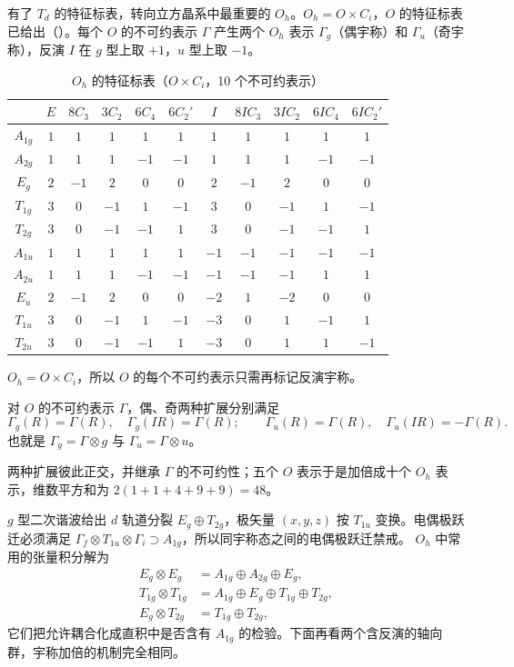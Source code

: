 有了 $T_d$ 的特征标表，转向立方晶系中最重要的 $O_h$。$O_h=O\times C_i$，$O$ 的特征标表已给出（）。每个 $O$ 的不可约表示 $\Gamma$ 产生两个 $O_h$ 表示 $\Gamma_g$（偶宇称）和 $\Gamma_u$（奇宇称），反演 $I$ 在 $g$ 型上取 $+1$，$u$ 型上取 $-1$。

\begin{table}[htbp]

\centering
\caption{$O_h$ 的特征标表（$O\times C_i$，10 个不可约表示）}
\label{tab:oh-character}
\small
\begin{tabular}{c|cccccccccc}
\toprule
 & $E$ & $8C_3$ & $3C_2$ & $6C_4$ & $6C_2'$ & $I$ & $8IC_3$ & $3IC_2$ & $6IC_4$ & $6IC_2'$ \\
\midrule
$A_{1g}$ & $1$&$1$&$1$&$1$&$1$&$1$&$1$&$1$&$1$&$1$ \\
$A_{2g}$ & $1$&$1$&$1$&$-1$&$-1$&$1$&$1$&$1$&$-1$&$-1$ \\
$E_g$   & $2$&$-1$&$2$&$0$&$0$&$2$&$-1$&$2$&$0$&$0$ \\
$T_{1g}$ & $3$&$0$&$-1$&$1$&$-1$&$3$&$0$&$-1$&$1$&$-1$ \\
$T_{2g}$ & $3$&$0$&$-1$&$-1$&$1$&$3$&$0$&$-1$&$-1$&$1$ \\
$A_{1u}$ & $1$&$1$&$1$&$1$&$1$&$-1$&$-1$&$-1$&$-1$&$-1$ \\
$A_{2u}$ & $1$&$1$&$1$&$-1$&$-1$&$-1$&$-1$&$-1$&$1$&$1$ \\
$E_u$   & $2$&$-1$&$2$&$0$&$0$&$-2$&$1$&$-2$&$0$&$0$ \\
$T_{1u}$ & $3$&$0$&$-1$&$1$&$-1$&$-3$&$0$&$1$&$-1$&$1$ \\
$T_{2u}$ & $3$&$0$&$-1$&$-1$&$1$&$-3$&$0$&$1$&$1$&$-1$ \\
\bottomrule
\end{tabular}

\end{table}

$O_h=O\times C_i$，所以 $O$ 的每个不可约表示只需再标记反演宇称。

对 $O$ 的不可约表示 $\Gamma$，偶、奇两种扩展分别满足
\[
\Gamma_g(R)=\Gamma(R),\quad\Gamma_g(IR)=\Gamma(R);
\qquad
\Gamma_u(R)=\Gamma(R),\quad\Gamma_u(IR)=-\Gamma(R).
\]
也就是 $\Gamma_g=\Gamma\otimes g$ 与 $\Gamma_u=\Gamma\otimes u$。

两种扩展彼此正交，并继承 $\Gamma$ 的不可约性；五个 $O$ 表示于是加倍成十个 $O_h$ 表示，维数平方和为 $2(1+1+4+9+9)=48$。

$g$ 型二次谐波给出 $d$ 轨道分裂 $E_g\oplus T_{2g}$，极矢量 $(x,y,z)$ 按 $T_{1u}$ 变换。电偶极跃迁必须满足 $\Gamma_f\otimes T_{1u}\otimes\Gamma_i\supset A_{1g}$，所以同宇称态之间的电偶极跃迁禁戒。
$O_h$ 中常用的张量积分解为
\begin{align*}
E_g\otimes E_g &= A_{1g}\oplus A_{2g}\oplus E_g,\\
T_{1g}\otimes T_{1g} &= A_{1g}\oplus E_g\oplus T_{1g}\oplus T_{2g},\\
E_g\otimes T_{2g} &= T_{1g}\oplus T_{2g},
\end{align*}
它们把允许耦合化成直积中是否含有 $A_{1g}$ 的检验。下面再看两个含反演的轴向群，宇称加倍的机制完全相同。

